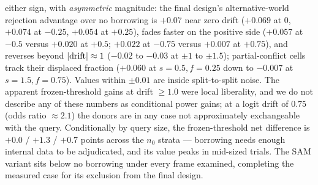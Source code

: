 \documentclass[11pt]{article}
\begin{document}
either sign, with \emph{asymmetric} magnitude: the final design's
alternative-world rejection advantage over no borrowing is $+0.07$ near
zero drift ($+0.069$ at $0$, $+0.074$ at $-0.25$, $+0.054$ at $+0.25$),
fades faster on the positive side ($+0.057$ at $-0.5$ versus $+0.020$ at
$+0.5$; $+0.022$ at $-0.75$ versus $+0.007$ at $+0.75$), and reverses
beyond $|{\rm drift}|
\approx 1$ ($-0.02$ to $-0.03$ at $\pm 1$ to $\pm 1.5$); partial-conflict
cells track their displaced fraction ($+0.060$ at $s{=}0.5, f{=}0.25$
down to $-0.007$ at $s{=}1.5, f{=}0.75$). Values within $\pm 0.01$ are
inside split-to-split noise. The apparent frozen-threshold gains at
drift $\ge 1.0$ were local liberality, and we do not describe any of
these numbers as conditional power gains; at a logit drift of $0.75$
(odds ratio $\approx 2.1$) the donors are in any case not approximately
exchangeable with the query.
Conditionally by query size, the frozen-threshold net difference
is $+0.0$ / $+1.3$ / $+0.7$ points across the $n_0$ strata --- borrowing
needs enough internal data to be adjudicated, and its value peaks in
mid-sized trials. The SAM variant sits below no borrowing under every
frame examined, completing the measured case for its exclusion from the
final design.
\end{document}
